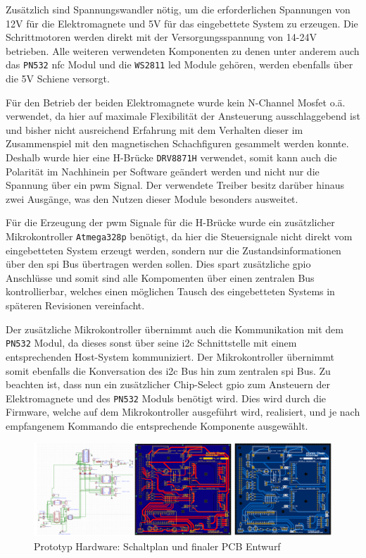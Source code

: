 Zusätzlich sind Spannungswandler nötig, um die erforderlichen Spannungen
von 12V für die Elektromagnete und 5V für das eingebettete System zu
erzeugen. Die Schrittmotoren werden direkt mit der Versorgungsspannung
von 14-24V betrieben. Alle weiteren verwendeten Komponenten zu denen
unter anderem auch das \passthrough{\lstinline!PN532!} \gls{nfc} Modul
und die \passthrough{\lstinline!WS2811!} \gls{led} Module gehören,
werden ebenfalls über die 5V Schiene versorgt.

Für den Betrieb der beiden Elektromagnete wurde kein N-Channel Mosfet
o.ä. verwendet, da hier auf maximale Flexibilität der Ansteuerung
ausschlaggebend ist und bisher nicht ausreichend Erfahrung mit dem
Verhalten dieser im Zusammenspiel mit den magnetischen Schachfiguren
gesammelt werden konnte. Deshalb wurde hier eine H-Brücke
\passthrough{\lstinline!DRV8871H!} verwendet, somit kann auch die
Polarität im Nachhinein per Software geändert werden und nicht nur die
Spannung über ein \gls{pwm} Signal. Der verwendete Treiber besitz
darüber hinaus zwei Ausgänge, was den Nutzen dieser Module besonders
ausweitet.

Für die Erzeugung der \gls{pwm} Signale für die H-Brücke wurde ein
zusätzlicher Mikrokontroller \passthrough{\lstinline!Atmega328p!}
benötigt, da hier die Steuersignale nicht direkt vom eingebetteten
System erzeugt werden, sondern nur die Zustandsinformationen über den
\gls{spi} Bus übertragen werden sollen. Dies spart zusätzliche
\gls{gpio} Anschlüsse und somit sind alle Kompomenten über einen
zentralen Bus kontrollierbar, welches einen möglichen Tausch des
eingebetteten Systems in späteren Revisionen vereinfacht.

Der zusätzliche Mikrokontroller übernimmt auch die Kommunikation mit dem
\passthrough{\lstinline!PN532!} Modul, da dieses sonst über seine
\gls{i2c} Schnittstelle mit einem entsprechenden Host-System
kommuniziert. Der Mikrokontroller übernimmt somit ebenfalls die
Konversation des \gls{i2c} Bus hin zum zentralen \gls{spi} Bus. Zu
beachten ist, dass nun ein zusätzlicher Chip-Select \gls{gpio} zum
Ansteuern der Elektromagnete und des \passthrough{\lstinline!PN532!}
Moduls benötigt wird. Dies wird durch die Firmware, welche auf dem
Mikrokontroller ausgeführt wird, realisiert, und je nach empfangenem
Kommando die entsprechende Komponente ausgewählt.

\begin{figure}
\centering
\includegraphics{images/ATC_DK_HW_SCHEM.png}
\caption{Prototyp Hardware: Schaltplan und finaler PCB Entwurf
\label{ATC_Schematic_DK}}
\end{figure}

